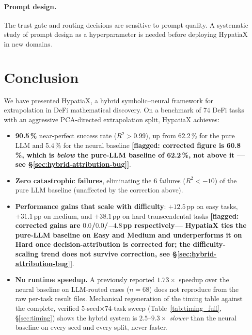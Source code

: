 \documentclass[twoside,11pt]{article}
\newcommand{\Rsq}{R^{2}}
\begin{document}
\paragraph{Prompt design.}
The trust gate and routing decisions are sensitive to prompt quality.  A systematic
study of prompt design as a hyperparameter is needed before deploying HypatiaX
in new domains.

\section{Conclusion}
\label{sec:conclusion}

We have presented HypatiaX, a hybrid symbolic--neural framework for extrapolation
in DeFi mathematical discovery.  On a benchmark of 74 DeFi tasks with an aggressive
PCA-directed extrapolation split, HypatiaX achieves:

\begin{itemize}
  \item \textbf{90.5\,\%} near-perfect success rate ($\Rsq > 0.99$), up from
    62.2\,\% for the pure LLM and 5.4\,\% for the neural baseline
    \textbf{[flagged: corrected figure is 60.8\,\%, which is \emph{below}
    the pure-LLM baseline of 62.2\,\%, not above it --- see
    \S\ref{sec:hybrid-attribution-bug}]}.
  \item \textbf{Zero catastrophic failures}, eliminating the 6 failures ($\Rsq < -10$)
    of the pure LLM baseline (unaffected by the correction above).
  \item \textbf{Performance gains that scale with difficulty}: $+12.5$\,pp on easy tasks,
    $+31.1$\,pp on medium, and $+38.1$\,pp on hard transcendental tasks
    \textbf{[flagged: corrected gains are $0.0$/$0.0$/$-4.8$\,pp respectively---
    HypatiaX ties the pure-LLM baseline on Easy and Medium and underperforms it
    on Hard once decision-attribution is corrected for; the difficulty-scaling
    trend does not survive correction, see \S\ref{sec:hybrid-attribution-bug}]}.
  \item \textbf{No runtime speedup.} A previously reported $1.73\times$ speedup
    over the neural baseline on LLM-routed cases ($n=68$) does not reproduce
    from the raw per-task result files. Mechanical regeneration of the timing
    table against the complete, verified 5-seed$\times$74-task sweep
    (Table~\ref{tab:timing_full}, \S\ref{sec:timing}) shows the hybrid
    system is $2.5$--$9.3\times$ \emph{slower} than the neural baseline on
    every seed and every split, never faster.
\end{itemize}
\end{document}
